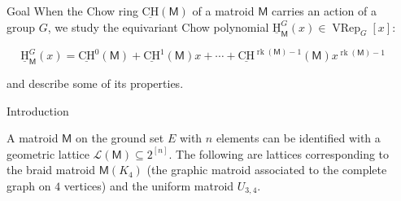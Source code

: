 \documentclass[final]{beamer}
\newlength{\sepwid}
\newlength{\onecolwid}
\DeclareMathOperator{\rk}{rk}
\newcommand{\M}{\mathsf{M}}
\newcommand{\uH}{\underline{\mathrm{H}}}
\newcommand{\uCH}{\underline{\mathrm{CH}}}
\newcommand{\cL}{\mathcal{L}}
\newcommand{\VRep}{\operatorname{VRep}}
\begin{document}
\begin{frame}[t] %

\begin{columns}[t] %

\begin{column}{\sepwid}\end{column} %

\begin{column}{\onecolwid} %

\begin{block}{Goal}
When the Chow ring $\uCH(\M)$ of a matroid $\M$ carries an action of a
group $G$, we study the equivariant Chow polynomial $\uH_{\M}^G(x) \in \VRep_G[x]$:

\[\uH_\M^G(x) = \uCH^0(\M)+\uCH^1(\M)x+\cdots +\uCH^{\rk(\M)-1}(\M)x^{\rk(\M)-1}\]

and describe some of its properties.
\end{block}

\vspace{-5mm}
\begin{block}{Introduction}

A matroid $\M$ on the ground set $E$ with $n$ elements
can be identified with a geometric lattice
$\cL(\M)\subseteq 2^{[n]}$.
The following are  lattices corresponding to the braid matroid $\M(K_4)$
(the graphic matroid associated to the
complete graph on $4$ vertices)
and the uniform matroid $U_{3,4}$.

\begin{center}
    \begin{minipage}[t]{0.5\textwidth}
    \kern0pt
    \raggedright
    
    \begin{figure}
\end{figure}
\end{minipage}
\end{center}
\end{block}
\end{column}
\end{columns}
\end{frame}
\end{document}

